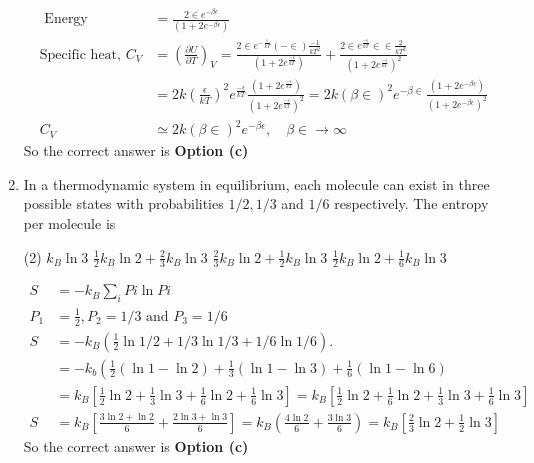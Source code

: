 \begin{enumerate}
\begin{answer}
\begin{align*}
\text{	Energy }&=\frac{2 \in e^{-\beta \epsilon}}{\left(1+2 e^{-\beta \epsilon}\right)}\\
	\text{Specific heat, }C_{V}&=\left(\frac{\partial U}{\partial T}\right)_{V}=\frac{2 \in e^{-\frac{\epsilon}{k T}}(-\in) \frac{-1}{k T^{2}}}{\left(1+2 e^{\frac{-\epsilon}{k T}}\right)}+\frac{2 \in e^{\frac{-\epsilon}{k T}} \in \in \frac{2}{k T^{2}}}{\left(1+2 e^{\frac{-\epsilon}{k T}}\right)^{2}}\\
	&=2 k\left(\frac{\epsilon}{k T}\right)^{2} e^{\frac{-\epsilon}{k T}} \frac{\left(1+2 e^{\frac{-\epsilon}{k T}}\right)}{\left(1+2 e^{\frac{-\epsilon}{k T}}\right)^{2}}=2 k(\beta \in)^{2} e^{-\beta \in} \frac{\left(1+2 e^{-\beta \epsilon}\right)}{\left(1+2 e^{-\beta \epsilon}\right)^{2}}\\
	C_{V} &\simeq 2 k(\beta \in)^{2} e^{-\beta \epsilon}, \quad \beta \in \rightarrow \infty
	\end{align*}
		So the correct answer is \textbf{Option (c)}
\end{answer}
\item In a thermodynamic system in equilibrium, each molecule can exist in three possible states with probabilities $1 / 2,1 / 3$ and $1 / 6$ respectively. The entropy per molecule is
 \begin{tasks}(2)
	\task[\textbf{a.}] $k_{B} \ln 3$
	\task[\textbf{b.}]$\frac{1}{2} k_{B} \ln 2+\frac{2}{3} k_{B} \ln 3$
	\task[\textbf{c.}]$\frac{2}{3} k_{B} \ln 2+\frac{1}{2} k_{B} \ln 3$
	\task[\textbf{d.}] $\frac{1}{2} k_{B} \ln 2+\frac{1}{6} k_{B} \ln 3$
\end{tasks}
\begin{answer}
	\begin{align*}
	S&=-k_{B} \sum_{i} P i \ln P i\\
	P_{1}&=\frac{1}{2}, P_{2}=1 / 3 \text { and } P_{3}=1 / 6 \\
	S&=-k_{B}\left(\frac{1}{2} \ln 1 / 2+1 / 3 \ln 1 / 3+1 / 6 \ln 1 / 6\right) . \\
	&=-k_{b}\left(\frac{1}{2}(\ln 1-\ln 2)+\frac{1}{3}(\ln 1-\ln 3)+\frac{1}{6}(\ln 1-\ln 6)\right. \\
	&=k_{B}\left[\frac{1}{2} \ln 2+\frac{1}{3} \ln 3+\frac{1}{6} \ln 2+\frac{1}{6} \ln 3\right]=k_{B}\left[\frac{1}{2} \ln 2+\frac{1}{6} \ln 2+\frac{1}{3} \ln 3+\frac{1}{6} \ln 3\right] \\
	S&=k_{B}\left[\frac{3 \ln 2+\ln 2}{6}+\frac{2 \ln 3+\ln 3}{6}\right]=k_{B}\left(\frac{4 \ln 2}{6}+\frac{3 \ln 3}{6}\right)=k_{B}\left[\frac{2}{3} \ln 2+\frac{1}{2} \ln 3\right]
	\end{align*}
		So the correct answer is \textbf{Option (c)}
\end{answer}
\end{enumerate}